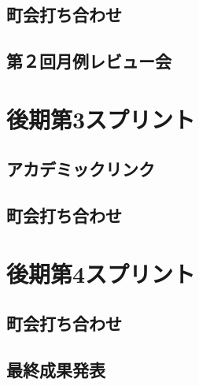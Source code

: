 \subsection{町会打ち合わせ}
\subsection{第２回月例レビュー会}

\section{後期第3スプリント}
\subsection{アカデミックリンク}
\subsection{町会打ち合わせ}

\section{後期第4スプリント}
\subsection{町会打ち合わせ}
\subsection{最終成果発表}
